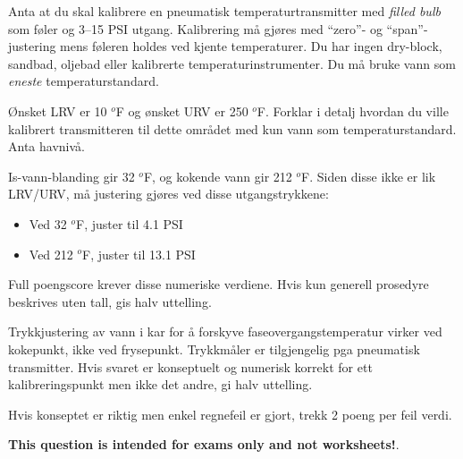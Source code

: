 

Anta at du skal kalibrere en pneumatisk temperaturtransmitter med {\it filled bulb} som føler og 3--15 PSI utgang. Kalibrering må gjøres med ``zero''- og ``span''-justering mens føleren holdes ved kjente temperaturer. Du har ingen dry-block, sandbad, oljebad eller kalibrerte temperaturinstrumenter. Du må bruke vann som {\it eneste} temperaturstandard.

\vskip 10pt

Ønsket LRV er 10 $^{o}$F og ønsket URV er 250 $^{o}$F. Forklar i detalj hvordan du ville kalibrert transmitteren til dette området med kun vann som temperaturstandard. Anta havnivå.

\vskip 50pt







Is-vann-blanding gir 32 $^{o}$F, og kokende vann gir 212 $^{o}$F. Siden disse ikke er lik LRV/URV, må justering gjøres ved disse utgangstrykkene:

\begin{itemize}
\item{} Ved 32 $^{o}$F, juster til 4.1 PSI
\vskip 5pt
\item{} Ved 212 $^{o}$F, juster til 13.1 PSI
\end{itemize}

Full poengscore krever disse numeriske verdiene. Hvis kun generell prosedyre beskrives uten tall, gis halv uttelling.

\vskip 10pt

Trykkjustering av vann i kar for å forskyve faseovergangstemperatur virker ved kokepunkt, ikke ved frysepunkt. Trykkmåler er tilgjengelig pga pneumatisk transmitter. Hvis svaret er konseptuelt og numerisk korrekt for ett kalibreringspunkt men ikke det andre, gi halv uttelling.

\vskip 10pt

Hvis konseptet er riktig men enkel regnefeil er gjort, trekk 2 poeng per feil verdi.







{\bf This question is intended for exams only and not worksheets!}.


